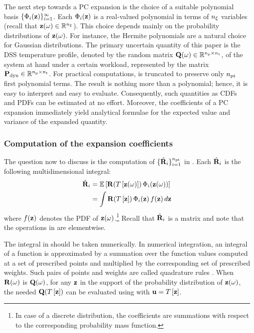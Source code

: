 The next step towards a PC expansion is the choice of a suitable polynomial basis $\{ \Phi_i(\mathbf{z}) \}_{i = 1}^\infty$.
Each $\Phi_i(\mathbf{z})$ is a real-valued polynomial in terms of ${n_\xi}$ variables (recall that $\mathbf{z}(\omega) \in \mathbb{R}^{n_\xi}$).
This choice depends mainly on the probability distributions of $\mathbf{z}(\omega)$.
For instance, the Hermite polynomials are a natural choice for Gaussian distributions.
The primary uncertain quantity of this paper is the DSS temperature profile, denoted by the random matrix $\mathbf{Q}(\omega) \in \mathbb{R}^{{n_\text{p}} \times {n_\text{t}}}$, of the system at hand under a certain workload, represented by the matrix $\mathbf{P}_{\text{dyn}} \in \mathbb{R}^{{n_\text{p}} \times {n_\text{t}}}$.
For practical computations,  is truncated to preserve only ${n_\text{pt}}$ first polynomial terms.
The result is nothing more than a polynomial; hence, it is easy to interpret and easy to evaluate.
Consequently, such quantities as CDFs and PDFs can be estimated at no effort.
Moreover, the coefficients of a PC expansion immediately yield analytical formulae for the expected value and variance of the expanded quantity.

\subsubsection{Computation of the expansion coefficients}
The question now to discuss is the computation of $\{ \hat{\mathbf{R}}_i \}_{i = 1}^{n_\text{pt}}$ in .
Each $\hat{\mathbf{R}}_i$ is the following multidimensional integral:
\begin{align}
  \pcc{\mR}_i & = \expectation{\mR(\oTransform{\vZ(\o)}) \, \pcb_i(\vZ(\o))} \nonumber \\
  & = \int \mR(\oTransform{\vZ}) \, \pcb_i(\vZ) \, \density(\vZ) \, \d\vZ \elab{polynomial-chaos-coefficients}
\end{align}
where $f(\mathbf{z})$ denotes the PDF of $\mathbf{z}(\omega)$.\footnote{In case of a discrete distribution, the coefficients are summations with respect to the corresponding probability mass function.}
Recall that $\hat{\mathbf{R}}_i$ is a matrix and note that the operations in  are elementwise.

The integral in  should be taken numerically.
In numerical integration, an integral of a function is approximated by a summation over the function values computed at a set of prescribed points and multiplied by the corresponding set of prescribed weights.
Such pairs of points and weights are called quadrature rules \cite{press2007}.
When $\mathbf{R}(\omega)$ is $\mathbf{Q}(\omega)$, for any $\mathbf{z}$ in the support of the probability distribution of $\mathbf{z}(\omega)$, the needed $\mQ(\oTransform{\vZ})$ can be evaluated using  with $\vU = \oTransform{\vZ}$.
